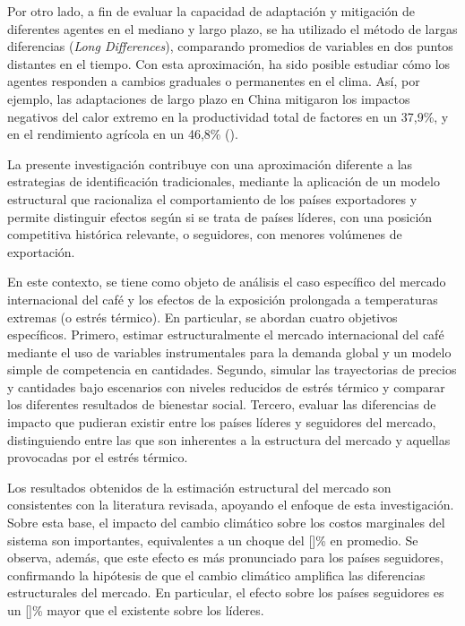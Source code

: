 Por otro lado, a fin de evaluar la capacidad de adaptación y mitigación de diferentes agentes en el mediano y largo plazo, se ha utilizado el método de largas diferencias (\textit{Long Differences}), comparando promedios de variables en dos puntos distantes en el tiempo. Con esta aproximación, ha sido posible estudiar cómo los agentes responden a cambios graduales o permanentes en el clima. Así, por ejemplo, las adaptaciones de largo plazo en China mitigaron los impactos negativos del calor extremo en la productividad total de factores en un 37,9\%, y en el rendimiento agrícola en un 46,8\% (\cite{chen2021response}).

La presente investigación contribuye con una aproximación diferente a las estrategias de identificación tradicionales, mediante la aplicación de un modelo estructural que racionaliza el comportamiento de los países exportadores y permite distinguir efectos según si se trata de países líderes, con una posición competitiva histórica relevante, o seguidores, con menores volúmenes de exportación. 

En este contexto, se tiene como objeto de análisis el caso específico del mercado internacional del café y los efectos de la exposición prolongada a temperaturas extremas (o estrés térmico). En particular, se abordan cuatro objetivos específicos. Primero, estimar estructuralmente el mercado internacional del café mediante el uso de variables instrumentales para la demanda global y un modelo simple de competencia en cantidades. Segundo, simular las trayectorias de precios y cantidades bajo escenarios con niveles reducidos de estrés térmico y comparar los diferentes resultados de bienestar social. Tercero, evaluar las diferencias de impacto que pudieran existir entre los países líderes y seguidores del mercado, distinguiendo entre las que son inherentes a la estructura del mercado y aquellas provocadas por el estrés térmico.

Los resultados obtenidos de la estimación estructural del mercado son consistentes con la literatura revisada, apoyando el enfoque de esta investigación. Sobre esta base, el impacto del cambio climático sobre los costos marginales del sistema son importantes, equivalentes a un choque del []\% en promedio. Se observa, además, que este efecto es más pronunciado para los países seguidores, confirmando la hipótesis de que el cambio climático amplifica las diferencias estructurales del mercado. En particular, el efecto sobre los países seguidores es un []\% mayor que el existente sobre los líderes.

